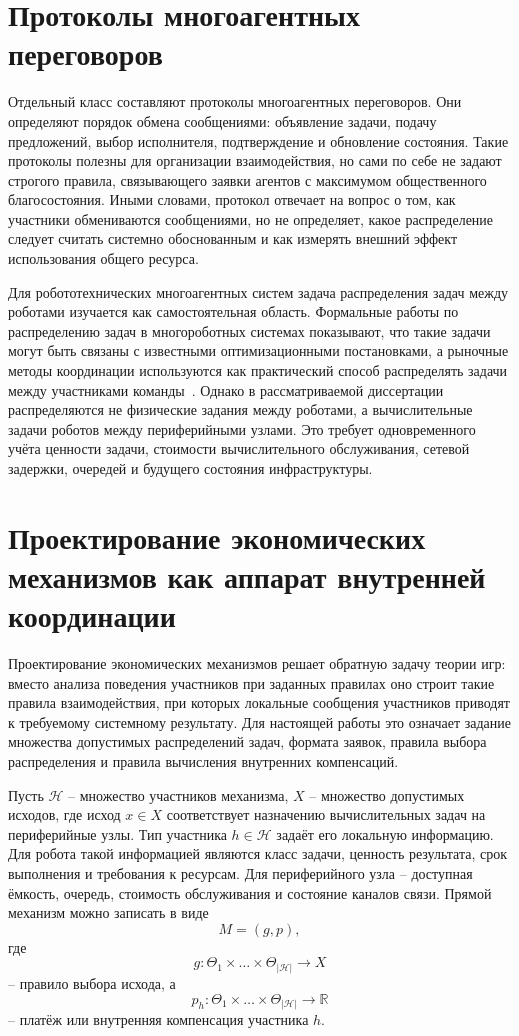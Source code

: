 \section{Протоколы многоагентных переговоров}

Отдельный класс составляют протоколы многоагентных переговоров. Они определяют порядок обмена сообщениями: объявление задачи, подачу предложений, выбор исполнителя, подтверждение и обновление состояния. Такие протоколы полезны для организации взаимодействия, но сами по себе не задают строгого правила, связывающего заявки агентов с максимумом общественного благосостояния. Иными словами, протокол отвечает на вопрос о том, как участники обмениваются сообщениями, но не определяет, какое распределение следует считать системно обоснованным и как измерять внешний эффект использования общего ресурса.

Для робототехнических многоагентных систем задача распределения задач между роботами изучается как самостоятельная область. Формальные работы по распределению задач в многороботных системах показывают, что такие задачи могут быть связаны с известными оптимизационными постановками, а рыночные методы координации используются как практический способ распределять задачи между участниками команды~\cite{Gerkey2004FormalMRTA,Dias2006MarketBasedMR}. Однако в рассматриваемой диссертации распределяются не физические задания между роботами, а вычислительные задачи роботов между периферийными узлами. Это требует одновременного учёта ценности задачи, стоимости вычислительного обслуживания, сетевой задержки, очередей и будущего состояния инфраструктуры.

\section{Проектирование экономических механизмов как аппарат внутренней координации}

Проектирование экономических механизмов решает обратную задачу теории игр: вместо анализа поведения участников при заданных правилах оно строит такие правила взаимодействия, при которых локальные сообщения участников приводят к требуемому системному результату. Для настоящей работы это означает задание множества допустимых распределений задач, формата заявок, правила выбора распределения и правила вычисления внутренних компенсаций.

Пусть $\mathcal{H}$ -- множество участников механизма, $X$ -- множество допустимых исходов, где исход $x \in X$ соответствует назначению вычислительных задач на периферийные узлы. Тип участника $h \in \mathcal{H}$ задаёт его локальную информацию. Для робота такой информацией являются класс задачи, ценность результата, срок выполнения и требования к ресурсам. Для периферийного узла -- доступная ёмкость, очередь, стоимость обслуживания и состояние каналов связи. Прямой механизм можно записать в виде
\[
M = (g,p),
\]
где
\[
g : \Theta_1 \times \ldots \times \Theta_{|\mathcal{H}|} \rightarrow X
\]
-- правило выбора исхода, а
\[
p_h : \Theta_1 \times \ldots \times \Theta_{|\mathcal{H}|} \rightarrow \mathbb{R}
\]
-- платёж или внутренняя компенсация участника $h$.

